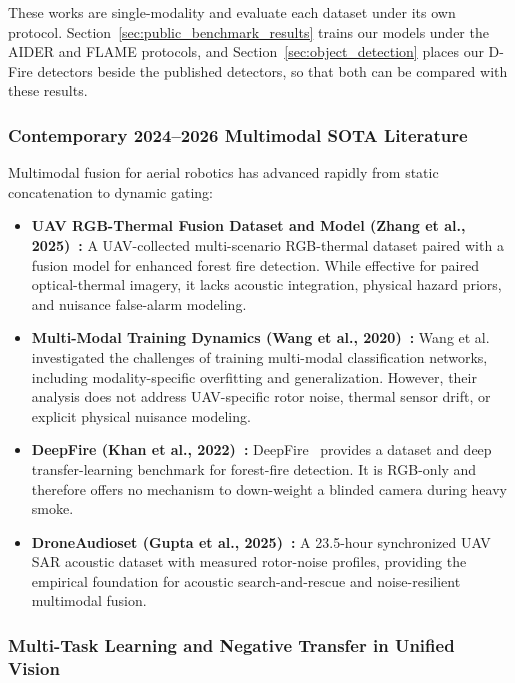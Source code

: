 \documentclass[journal]{IEEEtran}
\begin{document}
These works are single-modality and evaluate each dataset under its own protocol. Section~\ref{sec:public_benchmark_results} trains our models under the AIDER and FLAME protocols, and Section~\ref{sec:object_detection} places our D-Fire detectors beside the published detectors, so that both can be compared with these results.

\subsubsection{Contemporary 2024--2026 Multimodal SOTA Literature}

Multimodal fusion for aerial robotics has advanced rapidly from static concatenation to dynamic gating:

\begin{itemize}
    \item \textbf{UAV RGB-Thermal Fusion Dataset and Model (Zhang et al., 2025)~\cite{zhang2025rgbt}:} A UAV-collected multi-scenario RGB-thermal dataset paired with a fusion model for enhanced forest fire detection. While effective for paired optical-thermal imagery, it lacks acoustic integration, physical hazard priors, and nuisance false-alarm modeling.
    \item \textbf{Multi-Modal Training Dynamics (Wang et al., 2020)~\cite{wang2020makes}:} Wang et al.~\cite{wang2020makes} investigated the challenges of training multi-modal classification networks, including modality-specific overfitting and generalization. However, their analysis does not address UAV-specific rotor noise, thermal sensor drift, or explicit physical nuisance modeling.
    \item \textbf{DeepFire (Khan et al., 2022)~\cite{khan2022deepfire}:} DeepFire~\cite{khan2022deepfire} provides a dataset and deep transfer-learning benchmark for forest-fire detection. It is RGB-only and therefore offers no mechanism to down-weight a blinded camera during heavy smoke.
    \item \textbf{DroneAudioset (Gupta et al., 2025)~\cite{gupta2025droneaudioset}:} A 23.5-hour synchronized UAV SAR acoustic dataset with measured rotor-noise profiles, providing the empirical foundation for acoustic search-and-rescue and noise-resilient multimodal fusion.
\end{itemize}

\subsubsection{Multi-Task Learning and Negative Transfer in Unified Vision}
\end{document}
